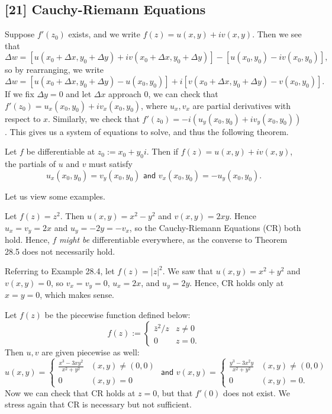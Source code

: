 \documentclass{article}
\begin{document}
\subsection*{[21] Cauchy-Riemann Equations}
Suppose $f'(z_0)$ exists, and we write $f(z) = u(x,y) + iv(x,y)$. Then we see that
$$\Delta w = [u(x_0 + \Delta x, y_0+\Delta y) + iv(x_0 + \Delta x, y_0 + \Delta y)] - [u(x_0, y_0) - iv(x_0, y_0)],$$
so by rearranging, we write
$$\Delta w = [u(x_0 + \Delta x, y_0 + \Delta y) - u(x_0, y_0)] + i[v(x_0 + \Delta x, y_0+\Delta y) - v(x_0, y_0)].$$
If we fix $\Delta y =0$ and let $\Delta x$ approach $0$, we can check that $f'(z_0) = u_x(x_0, y_0) + iv_x(x_0, y_0)$, where $u_x, v_x$ are partial derivatives with respect to $x$. Similarly, we check that $f'(z_0) = -i(u_y(x_0, y_0) + iv_y(x_0, y_0))$. This gives us a system of equations to solve, and thus the following theorem.
\begin{theorem}
Let $f$ be differentiable at $z_0 := x_0 + y_0i$. Then if $f(z) = u(x,y) + iv(x,y)$, the partials of $u$ and $v$ must satisfy
$$u_x(x_0, y_0) = v_y(x_0, y_0) \textsf{ and } v_x(x_0, y_0) = -u_y(x_0, y_0).$$
\end{theorem}
Let us view some examples.
\newpage
\begin{example}
Let $f(z) = z^2$. Then $u(x,y) = x^2-y^2$ and $v(x,y) = 2xy$. Hence $u_x = v_y = 2x$ and $u_y = -2y = -v_x$, so the Cauchy-Riemann Equations (CR) both hold. Hence, $f$ \textit{might be} differentiable everywhere, as the converse to Theorem 28.5 does not necessarily hold.
\end{example}
\begin{example}
Referring to Example 28.4, let $f(z) = |z|^2$. We saw that $u(x,y) = x^2+y^2$ and $v(x,y) = 0$, so $v_x = v_y = 0$, $u_x = 2x$, and $u_y = 2y$. Hence, CR holds only at $x=y=0$, which makes sense.
\end{example}
\begin{example}
Let $f(z)$ be the piecewise function defined below:
$$f(z) := \begin{cases}
\bar z^2/z & z\neq 0 \\ 0 & z=0.
\end{cases}$$
Then $u, v$ are given piecewise as well:
$$u(x,y) = \begin{cases}
    \frac{x^3-3xy^2}{x^2+y^2} & (x,y)\neq (0,0) \\
    0 & (x,y) = 0
\end{cases} \textsf{ and } v(x,y) = \begin{cases}
\frac{y^3-3x^2y}{x^2+y^2} & (x,y)\neq (0,0) \\ 0 & (x,y) = 0.
\end{cases}$$
Now we can check that CR holds at $z=0$, but that $f'(0)$ does not exist. We stress again that CR is necessary but not sufficient.
\end{example}
\setcounter{section}{29}
\end{document}
